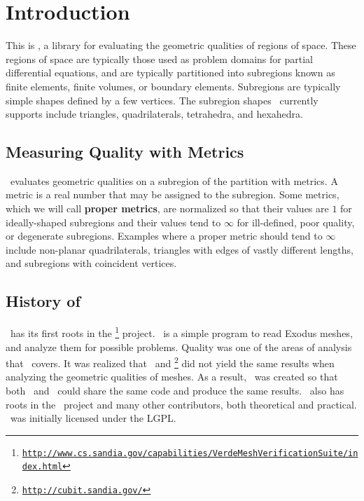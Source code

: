 \chapter{Introduction}

This is \verd, a library for evaluating the geometric qualities of regions of space.
These regions of space are typically those used as problem domains for partial differential equations,
and are typically partitioned into subregions known as finite elements, finite volumes, or boundary elements.
Subregions are typically simple shapes defined by a few vertices.
The subregion shapes \verd\ currently supports include triangles, quadrilaterals, tetrahedra, and hexahedra.

\section{Measuring Quality with Metrics}

\verd\ evaluates geometric qualities on a subregion of the partition with metrics.
A metric is a real number that may be assigned to the subregion.
Some metrics, which we will call \textbf{proper metrics}, are normalized so that
their values are $1$ for ideally-shaped subregions and
their values tend to $\infty$ for ill-defined, poor quality, or degenerate subregions.
Examples where a proper metric should tend to $\infty$ include non-planar quadrilaterals,
triangles with edges of vastly different lengths, and subregions with coincident vertices.

\section{History of \verd}

\verd\ has its first roots in the \href{http://www.cs.sandia.gov/capabilities/VerdeMeshVerificationSuite/index.html}{\verde}\footnote{\href{http://www.cs.sandia.gov/capabilities/VerdeMeshVerificationSuite/index.html}%
           {\texttt{http://www.cs.sandia.gov/capabilities/VerdeMeshVerificationSuite/index.html}}} project.
\verde\ is a simple program to
read Exodus meshes, and analyze them for possible problems.  Quality was one of
the areas of analysis that \verde\ covers.  It was realized that \verde\  and 
\href{http://cubit.sandia.gov/}{\cubit}\footnote{\href{http://cubit.sandia.gov/}{\texttt{http://cubit.sandia.gov/}}} did not yield the same results when analyzing the geometric qualities of meshes.
As a result, \verd\ was created so that both \verde\ and \cubit\ could share the same
code and produce the same results.  \verd\ also has roots in the \cubit\ project
and many other contributors, both theoretical and practical.
\verd\ was initially licensed under the LGPL.

